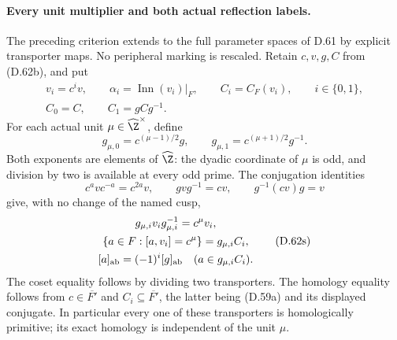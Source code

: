 \paragraph{Every unit multiplier and both actual reflection labels.}
The preceding criterion extends to the full parameter spaces
of D.61 by explicit transporter maps. No peripheral marking
is rescaled. Retain $c,v,g,C$ from (D.62b), and put
\[
 \begin{gathered}
 v_i=c^iv,\qquad \alpha_i=\operatorname{Inn}(v_i)|_F,
 \qquad C_i=C_F(v_i),\qquad i\in\{0,1\},\\
 C_0=C,\qquad C_1=gCg^{-1}.
 \end{gathered}                                         \tag{D.62q}
\]
For each actual unit $\mu\in\widehat\Z^\times$, define
\[
 g_{\mu,0}=c^{(\mu-1)/2}g,\qquad
 g_{\mu,1}=c^{(\mu+1)/2}g^{-1}.
                                                        \tag{D.62r}
\]
Both exponents are elements of $\widehat\Z$:
the dyadic coordinate of $\mu$ is odd, and division
by two is available at every odd prime.
The conjugation identities
\[
 c^avc^{-a}=c^{2a}v,\qquad
 gvg^{-1}=cv,\qquad g^{-1}(cv)g=v
\]
give, with no change of the named cusp,
\[
 \begin{gathered}
 g_{\mu,i}v_i g_{\mu,i}^{-1}=c^\mu v_i,\\
 \{a\in F:[a,v_i]=c^\mu\}=g_{\mu,i}C_i,\\
 [a]_{\rm ab}=(-1)^i[g]_{\rm ab}
           \quad(a\in g_{\mu,i}C_i).
 \end{gathered}                                         \tag{D.62s}
\]
The coset equality follows by dividing two transporters.
The homology equality follows from
$c\in\overline{F'}$ and
$C_i\subseteq\overline{F'}$, the latter being (D.59a)
and its displayed conjugate. In particular every one
of these transporters is homologically primitive;
its exact homology is independent of the unit $\mu$.

